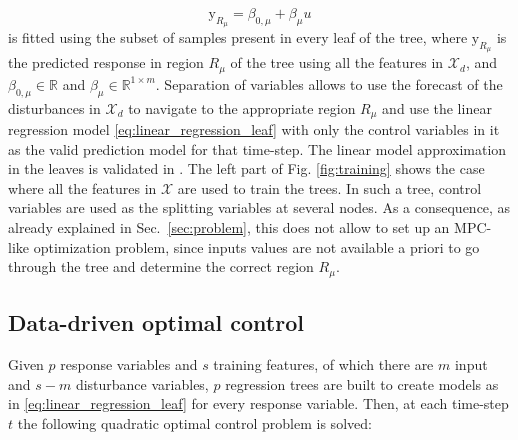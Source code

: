 \begin{equation}\label{eq:linear_regression_leaf}
\mathrm{y}_{R_\mu} = \beta_{0,\mu} + \beta_\mu u
\end{equation}
is fitted using the subset of samples present in every leaf of the tree, where $\mathrm{y}_{R_\mu}$ is the predicted response in region $R_\mu$ of the tree using all the features in $\mathcal{X}_d$, and $\beta_{0,\mu}\in\mathbb{R}$ and $\beta_\mu\in\mathbb{R}^{1\times m}$. 
Separation of variables allows to use the forecast of the disturbances in $\mathcal{X}_d$ to navigate to the appropriate region $R_\mu$ and use the linear regression model \eqref{eq:linear_regression_leaf} with only the control variables in it as the valid prediction model for that time-step.
The linear model approximation in the leaves is validated in \cite{Behl201630}.
The left part of Fig. \ref{fig:training} shows the case where all the features in $\mathcal{X}$ are used to train the trees. 
In such a tree, control variables are used as the splitting variables at several nodes. 
As a consequence, as already explained in Sec.~\ref{sec:problem}, this does not allow to set up an MPC-like optimization problem, since inputs values are not available a priori to go through the tree and determine the correct region $R_\mu$.

\subsection{Data-driven optimal control}
Given $p$ response variables and $s$ training features, of which there are $m$ input and $s-m$ disturbance variables, $p$ regression trees are built to create models as in \eqref{eq:linear_regression_leaf} for every response variable. Then, at each time-step $t$ the following quadratic optimal control problem is solved:

